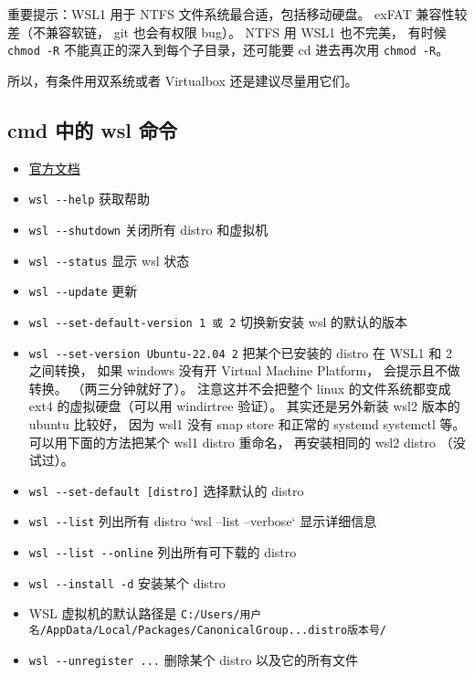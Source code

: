 
\begin{issues}
\issueDraft
\end{issues}

重要提示：WSL1 用于 NTFS 文件系统最合适，包括移动硬盘。 exFAT 兼容性较差（不兼容软链， git 也会有权限 bug）。 NTFS 用 WSL1 也不完美， 有时候 \verb|chmod -R| 不能真正的深入到每个子目录，还可能要 cd 进去再次用 \verb|chmod -R|。

所以，有条件用双系统或者 Virtualbox 还是建议尽量用它们。

\subsection{cmd 中的 wsl 命令}
\begin{itemize}
\item \href{https://docs.microsoft.com/en-us/windows/wsl/}{官方文档}
\item \verb`wsl --help` 获取帮助
\item \verb`wsl --shutdown` 关闭所有 distro 和虚拟机
\item \verb`wsl --status` 显示 wsl 状态
\item \verb`wsl --update` 更新
\item \verb`wsl --set-default-version 1 或 2` 切换新安装 wsl 的默认的版本
\item \verb`wsl --set-version Ubuntu-22.04 2` 把某个已安装的 distro 在 WSL1 和 2 之间转换， 如果 windows 没有开 Virtual Machine Platform， 会提示且不做转换。 （两三分钟就好了）。 注意这并不会把整个 linux 的文件系统都变成 ext4 的虚拟硬盘（可以用 windirtree 验证）。 其实还是另外新装 wsl2 版本的 ubuntu 比较好， 因为 wsl1 没有 snap store 和正常的 systemd systemctl 等。 可以用下面的方法把某个 wsl1 distro 重命名， 再安装相同的 wsl2 distro （没试过）。
\item \verb`wsl --set-default [distro]` 选择默认的 distro
\item \verb`wsl --list` 列出所有 distro `wsl --list --verbose` 显示详细信息
\item \verb`wsl --list --online` 列出所有可下载的 distro
\item \verb`wsl --install -d` 安装某个 distro
\item WSL 虚拟机的默认路径是 \verb`C:/Users/用户名/AppData/Local/Packages/CanonicalGroup...distro版本号/`
\item \verb`wsl --unregister ...` 删除某个 distro 以及它的所有文件


\end{itemize}
